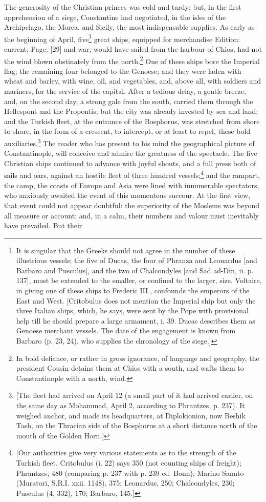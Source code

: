 The generosity of the Christian princes was cold and tardy; but, in the first apprehension of a siege, Constantine had negotiated, in the isles of the Archipelago, the Morea, and Sicily, the most indispensable supplies. As early as the beginning of April, five\footnote{It is singular that the Greeks should not agree in the number of these illustrious vessels; the five of Ducas, the four of Phranza and Leonardus [and Barbaro and Pusculus], and the two of Chalcondyles [and Sad ad-Dīn, ii. p. 137], must be extended to the smaller, or confined to the larger, size. Voltaire, in giving one of these ships to Frederic III., confounds the emperors of the East and West. [Critobulus does not mention the Imperial ship but only the three Italian ships, which, he says, were sent by the Pope with provisional help till he should prepare a large armament, i. 39. Ducas describes them as Genoese merchant vessels. The date of the engagement is known from Barbaro (p. 23, 24), who supplies the chronology of the siege.]} great ships, equipped for merchandise Edition: current; Page: [29] and war, would have sailed from the harbour of Chios, had not the wind blown obstinately from the north.\footnote{In bold defiance, or rather in gross ignorance, of language and geography, the president Cousin detains them at Chios with a south, and wafts them to Constantinople with a north, wind.} One of these ships bore the Imperial flag; the remaining four belonged to the Genoese; and they were laden with wheat and barley, with wine, oil, and vegetables, and, above all, with soldiers and mariners, for the service of the capital. After a tedious delay, a gentle breeze, and, on the second day, a strong gale from the south, carried them through the Hellespont and the Propontis; but the city was already invested by sea and land; and the Turkish fleet, at the entrance of the Bosphorus, was stretched from shore to shore, in the form of a crescent, to intercept, or at least to repel, these bold auxiliaries.\footnote{[The fleet had arrived on April 12 (a small part of it had arrived earlier, on the same day as Mohammad, April 2, according to Phrantzes, p. 237). It weighed anchor, and made its headquarters, at Diplokionion, now Beshik Tash, on the Thracian side of the Bosphorus at a short distance north of the mouth of the Golden Horn.]} The reader who has present to his mind the geographical picture of Constantinople, will conceive and admire the greatness of the spectacle. The five Christian ships continued to advance with joyful shouts, and a full press both of sails and oars, against an hostile fleet of three hundred vessels;\footnote{[Our authorities give very various statements as to the strength of the Turkish fleet. Critobulus (i. 22) says 350 (not counting ships of freight); Phrantzes, 480 (comparing p. 237 with p. 239 ed. Bonn); Marino Sanuto (Muratori, S.R.I. xxii. 1148), 375; Leonardus, 250; Chalcondyles, 230; Pusculus (4, 332), 170; Barbaro, 145.]} and the rampart, the camp, the coasts of Europe and Asia were lined with innumerable spectators, who anxiously awaited the event of this momentous succour. At the first view, that event could not appear doubtful: the superiority of the Moslems was beyond all measure or account; and, in a calm, their numbers and valour must inevitably have prevailed. But their 